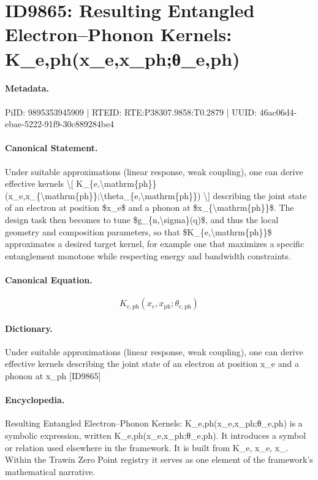 \section*{ID9865: Resulting Entangled Electron–Phonon Kernels: K\_e,ph(x\_e,x\_ph;θ\_e,ph)}
\paragraph{Metadata.}
PiID: 9895353945909 | RTEID: RTE:P38307.9858:T0.2879 | UUID: 46ac06d4-ebae-5222-91f9-30c889284be4

\paragraph{Canonical Statement.}
Under suitable approximations (linear response, weak coupling), one can derive effective kernels \textbackslash{}[ K\_\{e,\textbackslash{}mathrm\{ph\}\}(x\_e,x\_\{\textbackslash{}mathrm\{ph\}\};\textbackslash{}theta\_\{e,\textbackslash{}mathrm\{ph\}\}) \textbackslash{}] describing the joint state of an electron at position \$x\_e\$ and a phonon at \$x\_\{\textbackslash{}mathrm\{ph\}\}\$. The design task then becomes to tune \$g\_\{n,\textbackslash{}sigma\}(q)\$, and thus the local geometry and composition parameters, so that \$K\_\{e,\textbackslash{}mathrm\{ph\}\}\$ approximates a desired target kernel, for example one that maximizes a specific entanglement monotone while respecting energy and bandwidth constraints.

\paragraph{Canonical Equation.}
\[
K_{e,\mathrm{ph}}(x_e,x_{\mathrm{ph}};\theta_{e,\mathrm{ph}})
\]

\paragraph{Dictionary.}
Under suitable approximations (linear response, weak coupling), one can derive effective kernels describing the joint state of an electron at position x\_e and a phonon at x\_ph [ID9865]

\paragraph{Encyclopedia.}
Resulting Entangled Electron–Phonon Kernels: K\_e,ph(x\_e,x\_ph;θ\_e,ph) is a symbolic expression, written K\_e,ph(x\_e,x\_ph;θ\_e,ph). It introduces a symbol or relation used elsewhere in the framework. It is built from K\_e, x\_e, x\_. Within the Trawin Zero Point registry it serves as one element of the framework's mathematical narrative.
